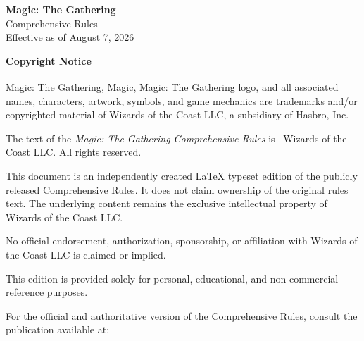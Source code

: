 \documentclass[11pt,twoside,openany]{book}
\begin{document}
	
	\thispagestyle{empty}
	
	\vspace*{\fill}
	
	\begin{center}
		{\Large \textbf{Magic: The Gathering}}\\[4pt]
		{\large Comprehensive Rules}\\[6pt]
		Effective as of August 7, 2026
	\end{center}
	
	\vspace{1.5cm}
	
	\noindent
	\textbf{Copyright Notice}
	
	\vspace{0.5cm}
	
	\noindent
	Magic: The Gathering\textsuperscript{\textregistered}, Magic\textsuperscript{\textregistered}, 
	Magic: The Gathering logo, and all associated names, characters, artwork, 
	symbols, and game mechanics are trademarks and/or copyrighted material of 
	Wizards of the Coast LLC, a subsidiary of Hasbro, Inc.
	
	\vspace{0.5cm}
	
	\noindent
	The text of the \textit{Magic: The Gathering Comprehensive Rules} is 
	\textcopyright\ Wizards of the Coast LLC. All rights reserved.
	
	\vspace{0.5cm}
	
	\noindent
	This document is an independently created LaTeX typeset edition of the 
	publicly released Comprehensive Rules. It does not claim ownership of the 
	original rules text. The underlying content remains the exclusive intellectual 
	property of Wizards of the Coast LLC.
	
	\vspace{0.5cm}
	
	\noindent
	No official endorsement, authorization, sponsorship, or affiliation with 
	Wizards of the Coast LLC is claimed or implied.
	
	\vspace{0.5cm}
	
	\noindent
	This edition is provided solely for personal, educational, and 
	non-commercial reference purposes.
	
	\vspace{0.5cm}
	
	\noindent
	For the official and authoritative version of the Comprehensive Rules, 
	consult the publication available at:
	
\end{document}
